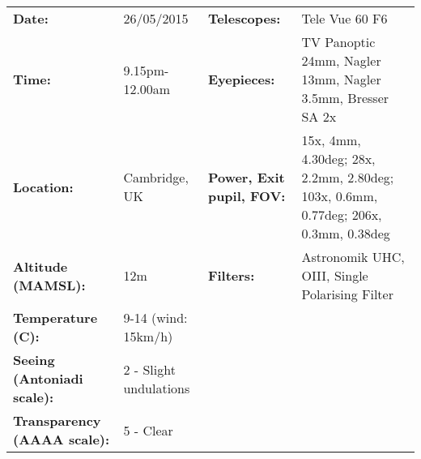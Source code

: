 \begin{tabular}{ p{1.7in} p{1.2in} p{1.5in} p{4.2in}}
{\bf Date:} & 26/05/2015 & {\bf Telescopes:} & Tele Vue 60 F6 \\ 
{\bf Time:} & 9.15pm-12.00am & {\bf Eyepieces:} & TV Panoptic 24mm, Nagler 13mm, Nagler 3.5mm, Bresser SA 2x \\ 
{\bf Location:} & Cambridge, UK & {\bf Power, Exit pupil, FOV:} & 15x, 4mm, 4.30deg; 28x, 2.2mm, 2.80deg; 103x, 0.6mm, 0.77deg; 206x, 0.3mm, 0.38deg \\ 
{\bf Altitude (MAMSL):} & 12m & {\bf Filters:} & Astronomik UHC, OIII, Single Polarising Filter \\ 
{\bf Temperature (C):} & 9-14 (wind: 15km/h) & & \\ 
{\bf Seeing (Antoniadi scale):} & 2 - Slight undulations & & \\ 
{\bf Transparency (AAAA scale):} & 5 - Clear & & \\ 
\end{tabular}
\centering 
